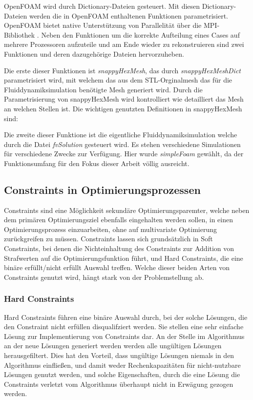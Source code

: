 OpenFOAM wird durch Dictionary-Dateien gesteuert.
Mit diesen Dictionary-Dateien werden die in OpenFOAM enthaltenen Funktionen parametrisiert.
OpenFOAM bietet native Unterstützung von Parallelität über die MPI-Bibliothek .
Neben den Funktionen um die korrekte Aufteilung eines Cases auf mehrere Prozessoren aufzuteile und am Ende wieder zu rekonstruieren sind zwei Funktionen und deren dazugehörige Dateien hervorzuheben.

Die erste dieser Funktionen ist \textit{snappyHexMesh}, das durch \textit{snappyHexMeshDict} parametrisiert wird, mit welchem das aus dem STL-Orginalmesh das für die Fluiddynamiksimulation benötigte Mesh generiert wird. Durch die Parametrisierung von snappyHexMesh wird kontrolliert wie detailliert das Mesh an welchen Stellen ist.
Die wichtigen genutzten Definitionen in snappyHexMesh sind:

Die zweite dieser Funktione ist die eigentliche Fluiddynamiksimulation welche durch die Datei \textit{fvSolution} gesteuert wird. 
Es stehen verschiedene Simulationen für verschiedene Zwecke zur Verfügung.
Hier wurde \textit{simpleFoam} gewählt, da der Funktionsumfang für den Fokus dieser Arbeit völlig ausreicht.


\subsection{Constraints in Optimierungsprozessen}
Constraints sind eine Möglichkeit sekundäre Optimierungsparemter, welche neben dem primären Optimierungsziel ebenfalls eingehalten werden sollen, in einen Optimierungsprozess einzuarbeiten, ohne auf multivariate Optimierung zurückgreifen zu müssen.
Constraints lassen sich grundsätzlich in Soft Constraints, bei denen die Nichteinhaltung des Constraints zur Addition von Strafwerten auf die Optimierungsfunktion führt, und Hard Constraints, die eine binäre erfüllt/nicht erfüllt Auswahl treffen.
Welche dieser beiden Arten von Constraints genutzt wird, hängt stark von der Problemstellung ab.

\subsubsection{Hard Constraints}
Hard Constraints führen eine binäre Auswahl durch, bei der solche Lösungen, die den Constraint nicht erfüllen disqualifziert werden.
Sie stellen eine sehr einfache Lösung zur Implementierung von Constraints dar.
An der Stelle im Algorithmus an der neue Lösungen generiert werden werden alle ungültigen Lösungen herausgefiltert.
Dies hat den Vorteil, dass ungültige Lösungen niemals in den Algorithmus einfließen, und damit weder Rechenkapazitäten für nicht-nutzbare Lösungen genutzt werden, und solche Eigenschaften, durch die eine Lösung die Constraints verletzt vom Algorithmus überhaupt nicht in Erwägung gezogen werden.


